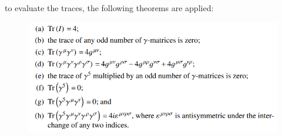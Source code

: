 \documentclass[10pt]{article}
\theoremstyle{definition}
\begin{document}
to evaluate the traces, the following theorems are applied:

\begin{figure}[H]
    \centering
    \includegraphics[scale=0.65]{trace.png}
\end{figure}
\end{document}
